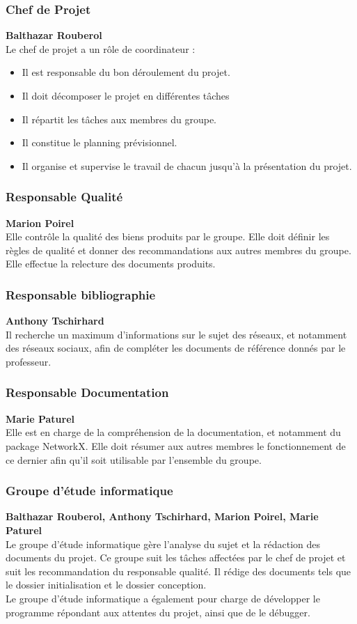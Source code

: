 \subsubsection{Chef de Projet}
\textbf{Balthazar Rouberol}\\
Le chef de projet a un rôle de coordinateur :  
\begin{itemize}
\item Il est responsable du bon déroulement du projet.
\item Il doit décomposer le projet en différentes tâches
\item Il répartit les tâches aux membres du groupe.
\item Il constitue le planning prévisionnel.
\item Il organise et supervise le travail de chacun jusqu'à la présentation du projet.
\end{itemize}
  
\subsubsection{Responsable Qualité}
\textbf{Marion Poirel}\\
Elle contrôle la qualité des biens produits par le groupe. Elle doit définir les règles de qualité et donner des recommandations aux autres membres du groupe. Elle effectue la relecture des documents produits.

\subsubsection{Responsable bibliographie}
\textbf{Anthony Tschirhard}\\
Il recherche un maximum d'informations sur le sujet des réseaux, et notamment des réseaux sociaux, afin de compléter les documents de référence donnés par le professeur.

\subsubsection{Responsable Documentation}
\textbf{Marie Paturel}\\
Elle est en charge de la compréhension de la documentation, et notamment du package NetworkX. Elle doit résumer aux autres membres le fonctionnement de ce dernier afin qu'il soit utilisable par l'ensemble du groupe.

\subsubsection{Groupe d'étude informatique}
\textbf{Balthazar Rouberol, Anthony Tschirhard, Marion Poirel, Marie Paturel}\\
Le groupe d'étude informatique gère l'analyse du sujet et la rédaction des documents du projet. Ce groupe suit les tâches affectées par le chef de projet et suit les recommandation du responsable qualité. Il rédige des documents tels que le dossier initialisation et le dossier conception.\\
Le groupe d'étude informatique a également pour charge de développer le programme répondant aux attentes du projet, ainsi que de le débugger.


